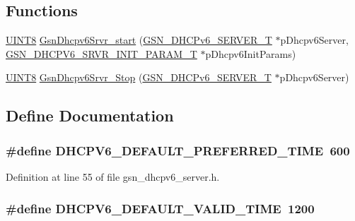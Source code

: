 \subsection*{Functions}
\begin{DoxyCompactItemize}
\item 
\hyperlink{a00660_gab27e9918b538ce9d8ca692479b375b6a}{UINT8} \hyperlink{a00483_a83ab55204cbb0c9629405de40c2837bc}{GsnDhcpv6Srvr\_\-start} (\hyperlink{a00047}{GSN\_\-DHCPv6\_\-SERVER\_\-T} $\ast$pDhcpv6Server, \hyperlink{a00048}{GSN\_\-DHCPV6\_\-SRVR\_\-INIT\_\-PARAM\_\-T} $\ast$pDhcpv6InitParams)
\item 
\hyperlink{a00660_gab27e9918b538ce9d8ca692479b375b6a}{UINT8} \hyperlink{a00483_afe3c216d47a0972d1ca5e7c7d94c19e5}{GsnDhcpv6Srvr\_\-Stop} (\hyperlink{a00047}{GSN\_\-DHCPv6\_\-SERVER\_\-T} $\ast$pDhcpv6Server)
\end{DoxyCompactItemize}


\subsection{Define Documentation}
\hypertarget{a00483_a4fad1fc7152257309c71c4bb436b2923}{
\subsubsection[{DHCPV6\_\-DEFAULT\_\-PREFERRED\_\-TIME}]{\setlength{\rightskip}{0pt plus 5cm}\#define DHCPV6\_\-DEFAULT\_\-PREFERRED\_\-TIME~600}}
\label{a00483_a4fad1fc7152257309c71c4bb436b2923}


Definition at line 55 of file gsn\_\-dhcpv6\_\-server.h.

\hypertarget{a00483_aa922293cdf6f9d7eb2565637343cc792}{
\subsubsection[{DHCPV6\_\-DEFAULT\_\-VALID\_\-TIME}]{\setlength{\rightskip}{0pt plus 5cm}\#define DHCPV6\_\-DEFAULT\_\-VALID\_\-TIME~1200}}
\label{a00483_aa922293cdf6f9d7eb2565637343cc792}


